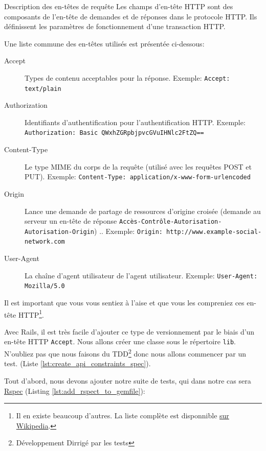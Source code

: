 \documentclass[]{report}
\begin{document}
    \begin{tcolorbox}{Description des en-têtes de requête}\label{box:http_headers}
      Les champs d'en-tête HTTP sont des composants de l'en-tête de demandes et de réponses dans le protocole HTTP. Ils définissent les paramètres de fonctionnement d'une transaction HTTP.

      Une liste commune des en-têtes utilisés est présentée ci-dessous:

      \begin{description}
        \item[Accept] Types de contenu acceptables pour la réponse. Exemple: \verb|Accept: text/plain|
        \item[Authorization] Identifiants d'authentification pour l'authentification HTTP. Exemple: \verb|Authorization: Basic QWxhZGRpbjpvcGVuIHNlc2FtZQ==|
        \item[Content-Type] Le type MIME du corps de la requête (utilisé avec les requêtes POST et PUT). Exemple: \verb|Content-Type: application/x-www-form-urlencoded|
        \item[Origin] Lance une demande de partage de ressources d'origine croisée (demande au serveur un en-tête de réponse \verb|Accès-Contrôle-Autorisation-Autorisation-Origin|) .. Exemple: \verb|Origin: http://www.example-social-network.com|
        \item[User-Agent] La chaîne d'agent utilisateur de l'agent utilisateur. Exemple: \verb|User-Agent: Mozilla/5.0|
      \end{description}

      Il est important que vous vous sentiez à l'aise et que vous les compreniez ces en-tête HTTP\footnote{Il en existe beaucoup d'autres. La liste complète est disponnible \href{https://en.wikipedia.org/wiki/List_of_HTTP_header_fields}{sur Wikipedia}.}.

    \end{tcolorbox}

    Avec Rails, il est très facile d'ajouter ce type de versionnement par le biais d'un en-tête HTTP \verb|Accept|. Nous allons créer une classe sous le répertoire \verb|lib|. N'oubliez pas que nous faisons du TDD\footnote{Développement Dirrigé par les tests} donc nous allons commencer par un test. (Liste \ref{lst:create_api_constraints_spec}).

    Tout d'abord, nous devons ajouter notre suite de tests, qui dans notre cas sera \href{http://rspec.info/}{Rspec} (Listing \ref{lst:add_rspect_to_gemfile}):
\end{document}
